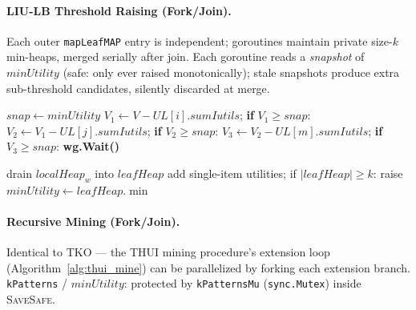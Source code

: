 \paragraph{LIU-LB Threshold Raising (Fork/Join).}
Each outer \texttt{mapLeafMAP} entry is independent; goroutines maintain
private size-$k$ min-heaps, merged serially after join.
Each goroutine reads a \emph{snapshot} of $\mathit{minUtility}$ (safe: only
ever raised monotonically); stale snapshots produce extra sub-threshold
candidates, silently discarded at merge.
\begin{algorithm}[H]
\caption{LIU-LB Threshold Raising (\texttt{raisingThresholdLeafParallel})}
\label{alg:pthui-liulb}
\begin{algorithmic}[1]
  \State $\mathit{snap} \leftarrow \mathit{minUtility}$
    \State {}
      \hfill{}
      \State $V_1 \leftarrow V - UL[i].\mathit{sumIutils}$;\quad
             \textbf{if} $V_1 \geq \mathit{snap}$: 
        \State $V_2 \leftarrow V_1 - UL[j].\mathit{sumIutils}$;\quad
               \textbf{if} $V_2 \geq \mathit{snap}$: 
          \State $V_3 \leftarrow V_2 - UL[m].\mathit{sumIutils}$;\quad
                 \textbf{if} $V_3 \geq \mathit{snap}$: 
        \EndFor
      \EndFor
    \EndFor
  \EndFor
\EndFor
\State {} \textbf{wg.Wait()}

  \State drain $\mathit{localHeap}_w$ into $\mathit{leafHeap}$
\EndFor
\State add single-item utilities; if $|\mathit{leafHeap}| \geq k$: raise $\mathit{minUtility} \leftarrow \mathit{leafHeap}.\min$
\end{algorithmic}
\end{algorithm}

\paragraph{Recursive Mining (Fork/Join).}
Identical to TKO --- the THUI mining procedure's extension loop (Algorithm~\ref{alg:thui_mine}) can be parallelized by forking each extension branch.
\texttt{kPatterns} / $\mathit{minUtility}$: protected by
        \texttt{kPatternsMu} (\texttt{sync.Mutex}) inside
        \textsc{SaveSafe}.

